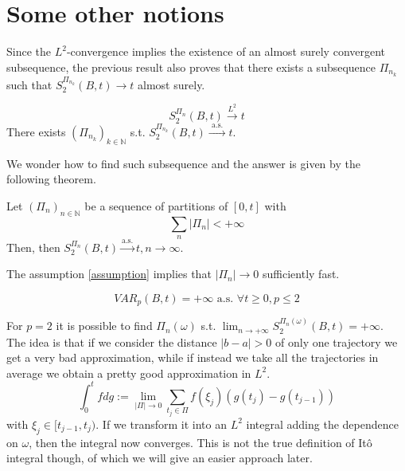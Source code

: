\section*{Some other notions}
Since the $L^2$-convergence implies the existence of an almost surely convergent subsequence, the previous result also proves that there exists a subsequence $\Pi_{n_k}$ such that $S_2^{\Pi_{n_k}}(B,t) \rightarrow t$ almost surely. 
\begin{PropBox}
    \begin{Proposition}
    \begin{equation*}
        S_2^{\Pi_n}(B,t) \xrightarrow{L^2} t
    \end{equation*}
    There exists $(\Pi_{n_k})_{k \in \mathbb{N}}$ s.t. $S_2^{\Pi_{n_k}} (B,t) \xrightarrow{ \text{ a.s. }} t$.
\end{Proposition}
\end{PropBox}
We wonder how to find such subsequence and the answer is given by the following theorem.  
\begin{ThBox}
    \begin{Th}
    Let $(\Pi_n)_{n \in \mathbb{N}}$ be a sequence of partitions of $[0,t]$ with 
        \begin{equation}
        \label{assumption}
            \sum_n |\Pi_n| < +\infty
        \end{equation}
    Then, then $S_2^{\Pi_n}(B,t) \xrightarrow{ \text{a.s.}} t, n \rightarrow \infty$.
\end{Th}
\end{ThBox}
\begin{remark}
    The assumption \ref{assumption} implies that $|\Pi_n| \rightarrow 0$ sufficiently fast.
\end{remark}
\begin{PropBox}
    \begin{Proposition}
    \begin{equation*}
        VAR_p(B,t) = +\infty \text{  a.s. } \forall t \geq 0, p \leq 2
    \end{equation*}
\end{Proposition}
\end{PropBox}
For $p=2$ it is possible to find $\Pi_n(\omega)$ s.t. $\lim_{n\rightarrow +\infty} S_2^{\Pi_n(\omega)} (B,t) = +\infty$.\\
The idea is that if we consider the distance $|b-a| > 0$ of only one trajectory we get a very bad approximation, while if instead we take all the trajectories in average we obtain a pretty good approximation in  $L^2$. 
\begin{equation*}
    \int_0^t f dg := \lim_{|\Pi| \rightarrow 0} \sum_{t_j \in \Pi} f(\xi_j)(g(t_j) - g(t_{j-1}))
\end{equation*}
with $\xi_j \in [t_{j-1}, t_j)$. If we transform it into an $L^2$ integral adding the dependence on $\omega$, then the integral now converges. This is not the true definition of Itô integral though, of which we will give an easier approach later.
